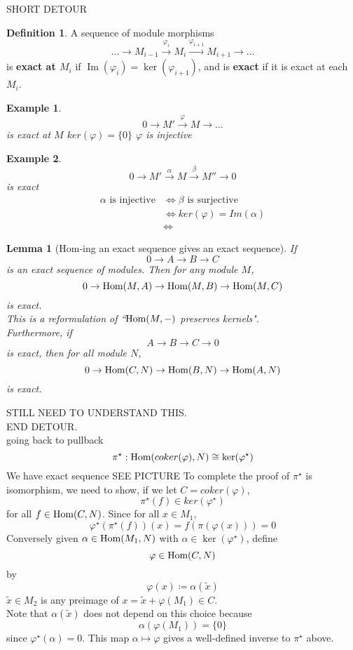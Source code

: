 \documentclass[12pt]{article}
\newcommand{\ho}[2]{\textup{Hom}(#1,#2)}
\DeclareMathOperator{\Im}{Im}
\newtheorem{lemma}[theorem]{Lemma}
\newtheorem*{eg}{Example}
\theoremstyle{definition}
\newtheorem{definition}[theorem]{Definition}
\begin{document}
SHORT DETOUR
\begin{definition}
A sequence of module morphisms 
\[
\dots \rightarrow M_{i-1}\xrightarrow{\varphi_{i}} M_i \xrightarrow{\varphi_{i+1}} M_{i+1} \rightarrow \dots
\]
is \textbf{exact at $M_i$} if $\Im(\varphi_{i}) = \ker(\varphi_{i+1})$, and is \textbf{exact} if it is exact at each $M_i$.
\end{definition}
\begin{eg}

\[
0\rightarrow M' \xrightarrow{\varphi} M \rightarrow \dots
\]
is exact at $M$ \iff $ker(\varphi) = \{0\}$ \iff $\varphi$ is injective
\end{eg}
\begin{eg}
\[
0\rightarrow M' \xrightarrow{\alpha} M \xrightarrow{\beta} M'' \rightarrow 0
\]
is exact
\begin{align*}
    \alpha\text{ is injective} &\iff \beta\text{ is surjective}\\
    & \iff ker(\varphi)=Im(\alpha)\\
    & \iff 
\end{align*}
\end{eg}
\begin{lemma}[Hom-ing an exact sequence gives an exact sequence]
If 
\[
0\rightarrow A \rightarrow B \rightarrow C
\]
is an exact sequence of modules. Then for any module $M$,
\[
0 \rightarrow \ho{M}{A} \rightarrow \ho{M}{B} \rightarrow \ho{M}{C}
\]
is exact.\\
This is a reformulation of ``$\ho{M}{-}$ preserves kernels".\\
Furthermore, if 
\[
A \rightarrow B\rightarrow C \rightarrow 0
\]
is exact, then for all module $N$,
\[
0 \rightarrow \ho{C}{N} \rightarrow \ho{B}{N} \rightarrow \ho{A}{N}
\]
is exact.
\end{lemma}
STILL NEED TO UNDERSTAND THIS.\\
END DETOUR.\\
going back to pullback
\[
\pi^\star: \ho{coker(\varphi)}{N} \cong \ker (\varphi^\star)
\]
We have exact sequence SEE PICTURE
To complete the proof of $\pi^\star$ is isomorphism, we need to show, if we let $C = coker(\varphi)$,
\[
\pi^\star (f) \in ker(\varphi^\star)
\]
for all $f\in \ho{C}{N}$. Since for all $x\in M_1$, 
\[
\varphi^\star(\pi^\star(f))(x) = f(\pi(\varphi(x))) = 0
\]
Conversely given $\alpha \in \ho{M_1}{N}$ with $\alpha \in \ker(\varphi^\star)$, define
\[
\varphi\in \ho{C}{N}
\]
by
\[
\varphi(x) \coloneqq \alpha(\tilde{x})
\]
\where $\tilde{x}\in M_2$ is any preimage of $x = \tilde{x}+\varphi(M_1)\in C$.\\
Note that $\alpha(\tilde{x})$ does not depend on this choice because
\[
\alpha(\varphi(M_1)) = \{0\}
\]
since $\varphi^\star (\alpha) =0$. This map $\alpha \mapsto \varphi$ gives a well-defined inverse to $\pi^\star$ above.
\end{document}
